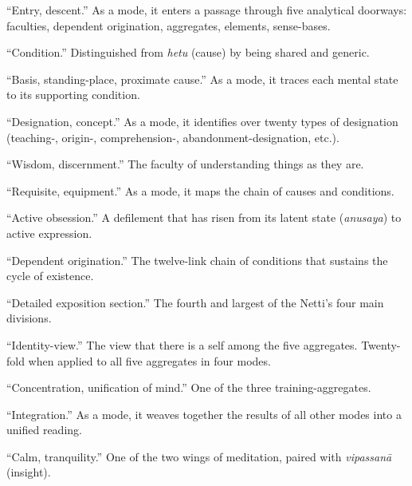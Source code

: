 \begin{description}[style=nextline, labelwidth=3.5cm, leftmargin=3.8cm, font=\itshape]
\item[otaraṇa] ``Entry, descent.'' As a mode, it enters a passage through five analytical doorways: faculties, dependent origination, aggregates, elements, sense-bases.

\item[paccaya] ``Condition.'' Distinguished from \textit{hetu} (cause) by being shared and generic.

\item[padaṭṭhāna] ``Basis, standing-place, proximate cause.'' As a mode, it traces each mental state to its supporting condition.

\item[paññatti] ``Designation, concept.'' As a mode, it identifies over twenty types of designation (teaching-, origin-, comprehension-, abandonment-designation, etc.).

\item[paññā] ``Wisdom, discernment.'' The faculty of understanding things as they are.

\item[parikkhāra] ``Requisite, equipment.'' As a mode, it maps the chain of causes and conditions.

\item[pariyuṭṭhāna] ``Active obsession.'' A defilement that has risen from its latent state (\textit{anusaya}) to active expression.

\item[paṭiccasamuppāda] ``Dependent origination.'' The twelve-link chain of conditions that sustains the cycle of existence.

\item[paṭiniddesavāra] ``Detailed exposition section.'' The fourth and largest of the Netti's four main divisions.

\item[sakkāyadiṭṭhi] ``Identity-view.'' The view that there is a self among the five aggregates. Twenty-fold when applied to all five aggregates in four modes.

\item[samādhi] ``Concentration, unification of mind.'' One of the three training-aggregates.

\item[samāropana] ``Integration.'' As a mode, it weaves together the results of all other modes into a unified reading.

\item[samatha] ``Calm, tranquility.'' One of the two wings of meditation, paired with \textit{vipassanā} (insight).


\end{description}
